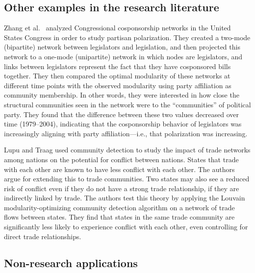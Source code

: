 \hypertarget{other-research}{\subsection{Other examples in the research
literature}\label{other-research}}

Zhang et al.~\autocite{zhang_community_2008} analyzed Congressional
cosponsorship networks in the United States Congress in order to study
partisan polarization. They created a two-mode (bipartite) network
between legislators and legislation, and then projected this network to
a one-mode (unipartite) network in which nodes are legislators, and
links between legislators represent the fact that they have cosponsored
bills together. They then compared the optimal modularity of these
networks at different time points with the observed modularity using
party affiliation as community membership. In other words, they were
interested in how close the structural communities seen in the network
were to the ``communities'' of political party. They found that the
difference between these two values decreased over time (1979--2004),
indicating that the cosponsorship behavior of legislators was
increasingly aligning with party affiliation---i.e., that polarization
was increasing.

Lupu and Traag \autocite{lupu_trading_2013} used community detection to
study the impact of trade networks among nations on the potential for
conflict between nations. States that trade with each other are known to
have less conflict with each other. The authors argue for extending this
to trade communities. Two states may also see a reduced risk of conflict
even if they do not have a strong trade relationship, if they are
indirectly linked by trade. The authors test this theory by applying the
Louvain modularity-optimizing community detection algorithm on a network
of trade flows between states. They find that states in the same trade
community are significantly less likely to experience conflict with each
other, even controlling for direct trade relationships.

\subsection{Non-research applications}\label{non-research-applications}

